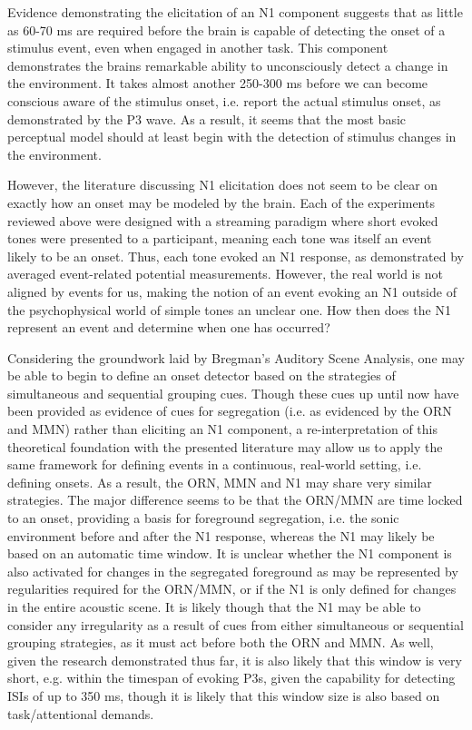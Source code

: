 \documentclass[a4paper,10pt,final]{ThesisStyle}
\begin{document}
Evidence demonstrating the elicitation of an N1 component suggests that as little as 60-70 ms are required before the brain is capable of detecting the onset of a stimulus event, even when engaged in another task.  This component demonstrates the brains remarkable ability to unconsciously detect a change in the environment.  It takes almost another 250-300 ms before we can become conscious aware of the stimulus onset, i.e. report the actual stimulus onset, as demonstrated by the P3 wave.  As a result, it seems that the most basic perceptual model should at least begin with the detection of stimulus changes in the environment.  

However, the literature discussing N1 elicitation does not seem to be clear on exactly how an onset may be modeled by the brain.  Each of the experiments reviewed above were designed with a streaming paradigm where short evoked tones were presented to a participant, meaning each tone was itself an event likely to be an onset.  Thus, each tone evoked an N1 response, as demonstrated by averaged event-related potential measurements.  However, the real world is not aligned by events for us, making the notion of an event evoking an N1 outside of the psychophysical world of simple tones an unclear one.  How then does the N1 represent an event and determine when one has occurred?

Considering the groundwork laid by Bregman's Auditory Scene Analysis, one may be able to begin to define an onset detector based on the strategies of simultaneous and sequential grouping cues.  Though these cues up until now have been provided as evidence of cues for segregation (i.e. as evidenced by the ORN and MMN) rather than eliciting an N1 component, a re-interpretation of this theoretical foundation with the presented literature may allow us to apply the same framework for defining events in a continuous, real-world setting, i.e. defining onsets.  As a result, the ORN, MMN and N1 may share very similar strategies.  The major difference seems to be that the ORN/MMN are time locked to an onset, providing a basis for foreground segregation, i.e. the sonic environment before and after the N1 response, whereas the N1 may likely be based on an automatic time window.  It is unclear whether the N1 component is also activated for changes in the segregated foreground as may be represented by regularities required for the ORN/MMN, or if the N1 is only defined for changes in the entire acoustic scene.  It is likely though that the N1 may be able to consider any irregularity as a result of cues from either simultaneous or sequential grouping strategies, as it must act before both the ORN and MMN.  As well, given the research demonstrated thus far, it is also likely that this window is very short, e.g. within the timespan of evoking P3s, given the capability for detecting ISIs of up to 350 ms, though it is likely that this window size is also based on task/attentional demands.  
\end{document}
